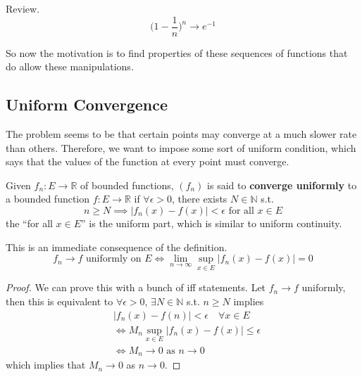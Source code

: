  \begin{example}
    Review. 
    \begin{equation}
      \bigg( 1 - \frac{1}{n} \bigg)^n \to e^{-1}
    \end{equation}
  \end{example}

  So now the motivation is to find properties of these sequences of functions that do allow these manipulations. 

\subsection{Uniform Convergence}

  The problem seems to be that certain points may converge at a much slower rate than others. Therefore, we want to impose some sort of uniform condition, which says that the values of the function at every point must converge. 

  \begin{definition}
    Given $f_n : E \to \mathbb{R}$ of bounded functions, $(f_n)$ is said to \textbf{converge uniformly} to a bounded function $f: E \to \mathbb{R}$ if $\forall \epsilon > 0$, there exists $N \in \mathbb{N}$ s.t. 
    \begin{equation}
      n \geq N \implies |f_n (x) - f(x) | < \epsilon \text{ for all } x \in E
    \end{equation}
    the ``for all $x \in E$'' is the uniform part, which is similar to uniform continuity. 
  \end{definition}

  \begin{theorem}
    This is an immediate consequence of the definition. 
    \begin{equation}
      f_n \to f \text{ uniformly on } E \iff \lim_{n \to \infty} \sup_{x \in E} |f_n (x) - f(x)| = 0
    \end{equation}
  \end{theorem}
  \begin{proof}
    We can prove this with a bunch of iff statements. Let $f_n \to f$ uniformly, then this is equivalent to $\forall \epsilon > 0$, $\exists N \in \mathbb{N}$ s.t. $n \geq N$ implies
    \begin{align}
      & |f_n (x) - f(n)| < \epsilon \quad \forall x \in E \\ 
      & \iff M_n \sup_{x \in E} |f_n (x) - f(x)| \leq \epsilon \\ 
      & \iff M_n \to 0 \text{ as } n \to 0
    \end{align}
    which implies that $M_n \to 0$ as $n \to 0$. 
  \end{proof}

